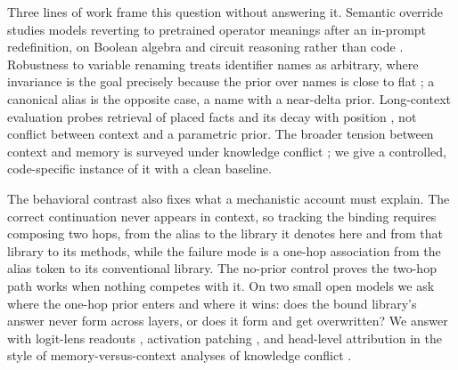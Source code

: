 \documentclass[11pt]{article}
\begin{document}
Three lines of work frame this question without answering it. Semantic override studies models reverting to pretrained operator meanings after an in-prompt redefinition, on Boolean algebra and circuit reasoning rather than code \citep{thota2026semantic}. Robustness to variable renaming treats identifier names as arbitrary, where invariance is the goal precisely because the prior over names is close to flat \citep{ramakrishnan2022semantic}; a canonical alias is the opposite case, a name with a near-delta prior. Long-context evaluation probes retrieval of placed facts and its decay with position \citep{liu2024lost,modarressi2025nolima}, not conflict between context and a parametric prior. The broader tension between context and memory is surveyed under knowledge conflict \citep{xu2024knowledge}; we give a controlled, code-specific instance of it with a clean baseline.

The behavioral contrast also fixes what a mechanistic account must explain. The correct continuation never appears in context, so tracking the binding requires composing two hops, from the alias to the library it denotes here and from that library to its methods, while the failure mode is a one-hop association from the alias token to its conventional library. The no-prior control proves the two-hop path works when nothing competes with it. On two small open models we ask where the one-hop prior enters and where it wins: does the bound library's answer never form across layers, or does it form and get overwritten? We answer with logit-lens readouts \citep{nostalgebraist2020interpreting}, activation patching \citep{vig2020investigating,meng2022locating}, and head-level attribution in the style of memory-versus-context analyses of knowledge conflict \citep{yu2023characterizing,jin2024cutting}.
\end{document}
